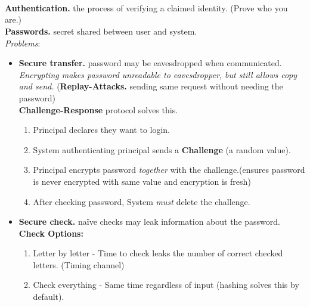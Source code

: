 \documentclass[9pt, a4paper]{extarticle}
\let\oldwarning\warning
\renewcommand{\warning}{\raisebox{0.3ex}{\oldwarning}}
\begin{document}
\small
\noindent
\\
\newpage
\\
\\
\footnotesize
\begin{minipage}[t]{0.495\textwidth}
	\textbf{Authentication.} the process of verifying a claimed identity. (Prove who you are.)\\
	\textbf{Passwords.} secret shared between user and system.\\
	\textit{Problems}:
	\begin{itemize}[leftmargin=10px]
		\item[I  ] \textbf{Secure transfer.} password may be eavesdropped when communicated.\\
		      \textit{Encrypting makes password unreadable to eavesdropper, but still allows copy and send.} (\warning \textbf{Replay-Attacks.} sending same request without needing the password)\\
		      \textbf{Challenge-Response} protocol solves this.
		      \begin{enumerate}[leftmargin=10px]
			      \item Principal declares they want to login.
			      \item System authenticating principal sends a \textbf{Challenge} (a random value).
			      \item Principal encrypts password \textit{together} with the challenge.(ensures password is never encrypted with same value and encryption is fresh)
			      \item After checking password, System \textit{must} delete the challenge.
		      \end{enumerate}

		\item[II ] \textbf{Secure check.} naïve checks may leak information about the password.\\
		      \textbf{Check Options:}
		      \begin{enumerate}[leftmargin=10px]
			      \item Letter by letter - Time to check leaks the number of correct checked letters. (Timing channel)
			      \item Check everything - Same time regardless of input (hashing solves this by default).
		      \end{enumerate}


\end{itemize}
\end{minipage}
\end{document}

